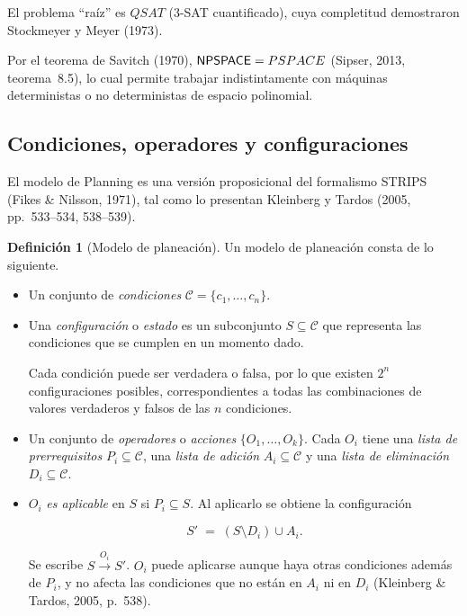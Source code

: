 \documentclass[11pt,letterpaper]{article}
\theoremstyle{plain}
\theoremstyle{definition}
\newtheorem{definicion}[teorema]{Definición}
\theoremstyle{remark}
\newcommand{\C}{\mathcal{C}}
\newcommand{\nombreMat}[1]{\ensuremath{\text{\fontencoding{OT1}\fontfamily{cmss}\upshape\selectfont #1}}}
\newcommand{\PSPACE}{\nombreMat{PSPACE}}
\newcommand{\NP}{\nombreMat{NP}}
\newcommand{\coNP}{\nombreMat{co-NP}}
\newcommand{\NPSPACE}{\nombreMat{NPSPACE}}
\newcommand{\QSAT}{\nombreMat{QSAT}}
\newcommand{\PLANNING}{\nombreMat{Planning}}
\newcommand{\Path}{\nombreMat{Path}}
\def\PSPACE{PSPACE}\def\NP{NP}\def\coNP{co-NP}%
\def\QSAT{QSAT}\def\PLANNING{Planning}\def\Path{Path}%
\begin{document}
El problema ``raíz'' es $\QSAT$ (3-SAT cuantificado),
cuya completitud demostraron Stockmeyer y Meyer (1973).

Por el teorema de Savitch (1970),
$\NPSPACE=\PSPACE$ (Sipser, 2013, teorema~8.5),
lo cual permite trabajar indistintamente con máquinas
deterministas o no deterministas de espacio polinomial.

\subsection{Condiciones, operadores y configuraciones}

El modelo de \PLANNING{} es una versión proposicional
del formalismo STRIPS (Fikes \& Nilsson, 1971),
tal como lo presentan Kleinberg y Tardos
(2005, pp.~533--534, 538--539).

\begin{definicion}[Modelo de planeación]\label{def:modelo}
Un modelo de planeación consta de lo siguiente.

\begin{itemize}[leftmargin=1.5em,itemsep=1pt]

\item Un conjunto de \emph{condiciones}
$\C=\{c_1,\dots,c_n\}$.

\item Una \emph{configuración} o \emph{estado}
es un subconjunto $S\subseteq\C$ que representa las
condiciones que se cumplen en un momento dado.


Cada condición puede ser verdadera o falsa, por lo que
existen $2^{n}$ configuraciones posibles, correspondientes
a todas las combinaciones de valores verdaderos y falsos
de las $n$ condiciones.


\item Un conjunto de \emph{operadores} o \emph{acciones}
$\{O_1,\dots,O_k\}$. Cada $O_i$ tiene una
\emph{lista de prerrequisitos} $P_i\subseteq\C$,
una \emph{lista de adición} $A_i\subseteq\C$
y una \emph{lista de eliminación} $D_i\subseteq\C$.

\item $O_i$ \emph{es aplicable} en $S$ si
$P_i\subseteq S$. Al aplicarlo se obtiene
la configuración

\[
S' \;=\; (S\setminus D_i)\cup A_i .
\]

Se escribe $S\xrightarrow{O_i}S'$.
$O_i$ puede aplicarse aunque haya otras condiciones
además de $P_i$, y no afecta las condiciones que no están
en $A_i$ ni en $D_i$
(Kleinberg \& Tardos, 2005, p.~538).

\end{itemize}
\end{definicion}
\end{document}
